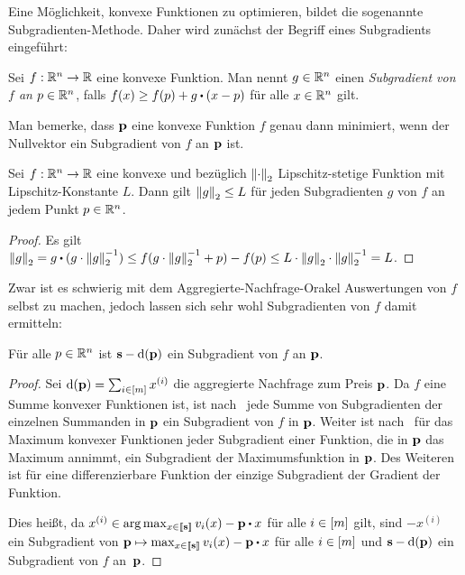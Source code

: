 Eine Möglichkeit, konvexe Funktionen zu optimieren, bildet die sogenannte Subgradienten-Methode.
Daher wird zunächst der Begriff eines Subgradients eingeführt:
\begin{definition}[Subgradient]
	Sei $f:\mathbb{R}^n \rightarrow \mathbb{R}$ eine konvexe Funktion.
	Man nennt $g\in\mathbb{R}^n$ einen \emph{Subgradient von $f$ an $p\in\mathbb{R}^n$}, falls $f(x) \geq f(p) + g\bcdot (x - p)$ für alle $x\in\mathbb{R}^n$ gilt.
\end{definition}
Man bemerke, dass $\mathbf{p}$ eine konvexe Funktion $f$ genau dann minimiert, wenn der Nullvektor ein Subgradient von $f$ an $\mathbf{p}$ ist.
\begin{proposition}\label{prop-convex-lipschitz}
Sei $f: \mathbb{R}^n \rightarrow \mathbb{R}$ eine konvexe und bezüglich $\left\lVert \cdot \right\rVert_2$ Lipschitz-stetige Funktion mit Lipschitz-Konstante $L$.
Dann gilt $\left\lVert g \right\rVert_2\leq L$ für jeden Subgradienten $g$ von $f$ an jedem Punkt $p\in\mathbb{R}^n$.
\end{proposition}
\begin{proof}
Es gilt $\norm{g} = g \bcdot (g \cdot \norm{g}^{-1}) \leq  f(g \cdot \norm{g}^{-1} + p) - f(p) \leq L \cdot \norm{g}\cdot \norm{g}^{-1} = L$.
\end{proof}

Zwar ist es schwierig mit dem Aggregierte-Nachfrage-Orakel Auswertungen von $f$ selbst zu machen, jedoch lassen sich sehr wohl Subgradienten von $f$ damit ermitteln:
\begin{lemma}\label{lemma-subgradient}
	Für alle $p\in\mathbb{R}^n$ ist $\mathbf{s} - \operatorname{d}(\mathbf{p})$ ein Subgradient von $f$ an $\mathbf{p}$.
\end{lemma}
\begin{proof}
	Sei $\operatorname{d}(\mathbf{p}) = \sum_{i\in\left[ m \right]} x^{(i)}$ die aggregierte Nachfrage zum Preis $\mathbf{p}$.
	Da $f$ eine Summe konvexer Funktionen ist, ist nach~\cite[Theorem~1.12]{Shor1985} jede Summe von Subgradienten der einzelnen Summanden in $\mathbf{p}$ ein Subgradient von $f$ in $\mathbf{p}$.
	Weiter ist nach~\cite[Theorem~1.13]{Shor1985} für das Maximum konvexer Funktionen jeder Subgradient einer Funktion, die in $\mathbf{p}$ das Maximum annimmt, ein Subgradient der Maximumsfunktion in $\mathbf{p}$.
	Des Weiteren ist für eine differenzierbare Funktion der einzige Subgradient der Gradient der Funktion.
	
	Dies heißt, da $x^{(i)}\in \arg\max_{x\in\ffirst{\fs}} v_i(x) - \fp \bcdot x$ für alle $i\in\left[ m \right]$ gilt, sind $-x^{(i)}$ ein Subgradient von $\fp \mapsto \max_{x\in\ffirst{\fs}} v_i(x) - \fp \bcdot x$ für alle $i\in\left[ m \right]$ und $\mathbf{s} - \operatorname{d}(\mathbf{p})$ ein Subgradient von $f$ an~$\mathbf{p}$.
\end{proof}

